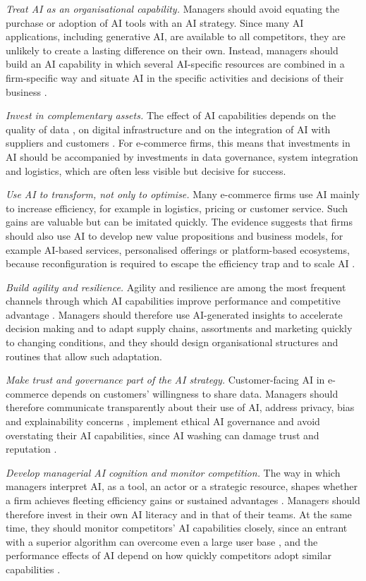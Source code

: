 \emph{Treat AI as an organisational capability.} Managers should avoid equating the purchase or adoption of AI tools with an AI strategy. Since many AI applications, including generative AI, are available to all competitors, they are unlikely to create a lasting difference on their own. Instead, managers should build an AI capability in which several AI-specific resources are combined in a firm-specific way  and situate AI in the specific activities and decisions of their business .

\emph{Invest in complementary assets.} The effect of AI capabilities depends on the quality of data , on digital infrastructure  and on the integration of AI with suppliers and customers . For e-commerce firms, this means that investments in AI should be accompanied by investments in data governance, system integration and logistics, which are often less visible but decisive for success.

\emph{Use AI to transform, not only to optimise.} Many e-commerce firms use AI mainly to increase efficiency, for example in logistics, pricing or customer service. Such gains are valuable but can be imitated quickly. The evidence suggests that firms should also use AI to develop new value propositions and business models, for example AI-based services, personalised offerings or platform-based ecosystems, because reconfiguration is required to escape the efficiency trap  and to scale AI .

\emph{Build agility and resilience.} Agility and resilience are among the most frequent channels through which AI capabilities improve performance and competitive advantage . Managers should therefore use AI-generated insights to accelerate decision making and to adapt supply chains, assortments and marketing quickly to changing conditions, and they should design organisational structures and routines that allow such adaptation.

\emph{Make trust and governance part of the AI strategy.} Customer-facing AI in e-commerce depends on customers' willingness to share data. Managers should therefore communicate transparently about their use of AI, address privacy, bias and explainability concerns , implement ethical AI governance  and avoid overstating their AI capabilities, since AI washing can damage trust and reputation .

\emph{Develop managerial AI cognition and monitor competition.} The way in which managers interpret AI, as a tool, an actor or a strategic resource, shapes whether a firm achieves fleeting efficiency gains or sustained advantages . Managers should therefore invest in their own AI literacy and in that of their teams. At the same time, they should monitor competitors' AI capabilities closely, since an entrant with a superior algorithm can overcome even a large user base , and the performance effects of AI depend on how quickly competitors adopt similar capabilities .


